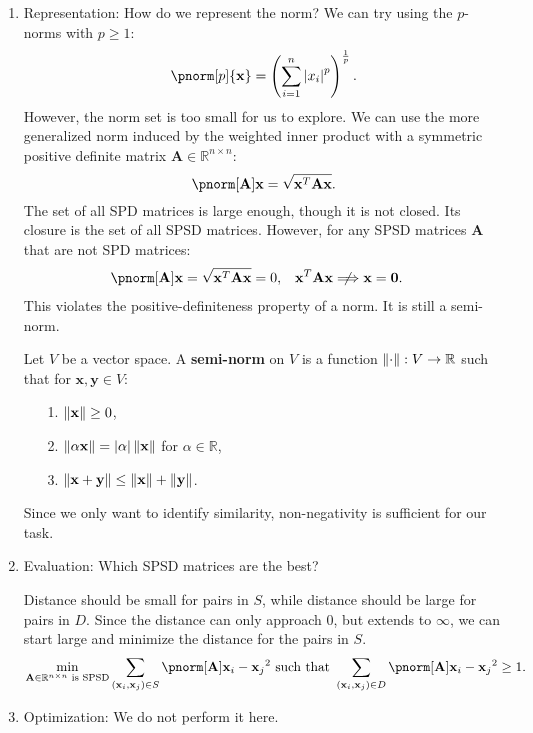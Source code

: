\documentclass{huhtakm-template-book-v2}
\begin{document}
    \begin{enumerate}
        \item Representation: How do we represent the norm? We can try using the $p$-norms with $p\geq 1$:
        \begin{equation*}
            \pnorm[p]{\mathbf{x}}=\left(\sum_{i=1}^{n}\abs{x_{i}}^{p}\right)^{\frac{1}{p}}.
        \end{equation*}
        However, the norm set is too small for us to explore. We can use the more generalized norm induced by the weighted inner product with a symmetric positive definite matrix $\mathbf{A}\in\mathbb{R}^{n\times n}$: 
        \begin{equation*}
            \pnorm[\mathbf{A}]{\mathbf{x}}=\sqrt{\mathbf{x}^{T}\mathbf{A}\mathbf{x}}.
        \end{equation*}
        The set of all SPD matrices is large enough, though it is not closed. Its closure is the set of all SPSD matrices. However, for any SPSD matrices $\mathbf{A}$ that are not SPD matrices:
        \begin{align*}
            \pnorm[\mathbf{A}]{\mathbf{x}}&=\sqrt{\mathbf{x}^{T}\mathbf{A}\mathbf{x}}=0, & 
            \mathbf{x}^{T}\mathbf{Ax}&\centernot{\Longrightarrow}\mathbf{x}=\mathbf{0}.
        \end{align*}
        This violates the positive-definiteness property of a norm. It is still a semi-norm.
        \begin{defn}
            Let $V$ be a vector space. A \textbf{semi-norm} on $V$ is a function $\lVert{\cdot}\rVert:V\to\mathbb{R}$ such that for $\mathbf{x},\mathbf{y}\in V$:
            \begin{itemize}
                \item[1.] $\lVert{\mathbf{x}}\rVert\geq 0$,
                \item[2.] $\lVert{\alpha\mathbf{x}}\rVert=\left|{\alpha}\right|\lVert{\mathbf{x}}\rVert$ for $\alpha\in\mathbb{R}$,
                \item[3.] $\lVert{\mathbf{x}+\mathbf{y}}\rVert\leq\lVert{\mathbf{x}}\rVert+\lVert{\mathbf{y}}\rVert$.
            \end{itemize}
        \end{defn}
        Since we only want to identify similarity, non-negativity is sufficient for our task.
        \item Evaluation: Which SPSD matrices are the best?
        
        Distance should be small for pairs in $S$, while distance should be large for pairs in $D$. Since the distance can only approach $0$, but extends to $\infty$, we can start large and minimize the distance for the pairs in $S$.
        \begin{equation*}
            \min_{\mathbf{A}\in\mathbb{R}^{n\times n}\text{ is SPSD}}\sum_{(\mathbf{x}_{i},\mathbf{x}_{j})\in S}\pnorm[\mathbf{A}]{\mathbf{x}_{i}-\mathbf{x}_{j}}^{2}\text{ such that }\sum_{(\mathbf{x}_{i},\mathbf{x}_{j})\in D}\pnorm[\mathbf{A}]{\mathbf{x}_{i}-\mathbf{x}_{j}}^{2}\geq 1.
        \end{equation*}
        \item Optimization: We do not perform it here.
    \end{enumerate}
\end{document}
